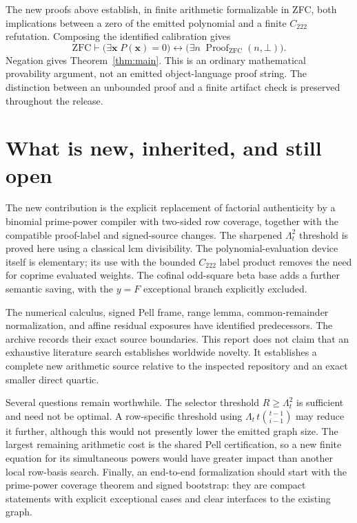 \documentclass[11pt]{article}
\theoremstyle{definition}
\begin{document}
The new proofs above establish, in finite arithmetic formalizable in ZFC,
both implications between a zero of the emitted polynomial and a finite
$C_{222}$ refutation. Composing the identified calibration gives
\[
 \mathrm{ZFC}\vdash
 \bigl(\exists\boldsymbol x\;P(\boldsymbol x)=0\bigr)
 \longleftrightarrow
 \bigl(\exists n\;\operatorname{Proof}_{\mathrm{ZFC}}(n,\bot)\bigr).
\]
Negation gives Theorem~\ref{thm:main}. This is an ordinary mathematical
provability argument, not an emitted object-language proof string. The
distinction between an unbounded proof and a finite artifact check is
preserved throughout the release.



\section{What is new, inherited, and still open}

The new contribution is the explicit replacement of factorial
authenticity by a binomial prime-power compiler with two-sided row coverage,
together with the compatible proof-label and signed-source changes.
The sharpened $\Lambda_t^2$ threshold is proved here using a classical
lcm divisibility. The polynomial-evaluation device itself is elementary;
its use with the bounded $C_{222}$ label product removes the need for
coprime evaluated weights. The cofinal odd-square beta base adds a further
semantic saving, with the $y=F$ exceptional branch explicitly excluded.

The numerical calculus, signed Pell frame, range lemma, common-remainder
normalization, and affine residual exposures have identified predecessors.
The archive records their exact source boundaries. This report does not
claim that an exhaustive literature search establishes worldwide novelty.
It establishes a complete new arithmetic source relative to the inspected
repository and an exact smaller direct quartic.

Several questions remain worthwhile. The selector threshold
$R\ge\Lambda_t^2$ is sufficient and need not be optimal. A row-specific
threshold using $\Lambda_t\,t\binom{t-1}{i-1}$ may reduce it further,
although this would not presently lower the emitted graph size. The
largest remaining arithmetic cost is the shared Pell certification, so a
new finite equation for its simultaneous powers would have greater impact
than another local row-basis search. Finally, an end-to-end formalization
should start with the prime-power coverage theorem and signed bootstrap:
they are compact statements with explicit exceptional cases and clear
interfaces to the existing graph.
\end{document}
